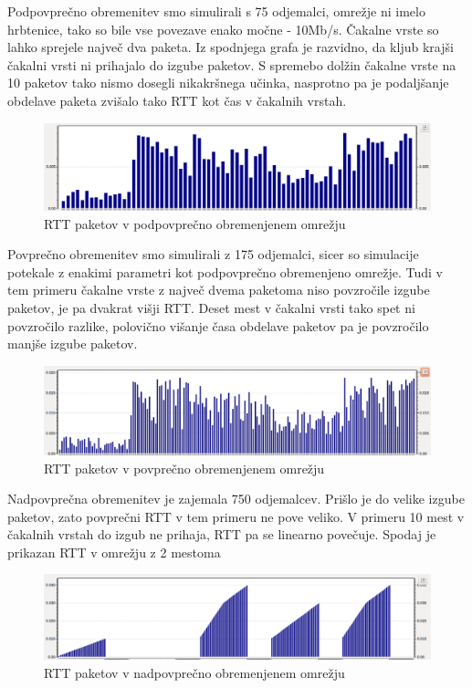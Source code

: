\documentclass[11pt, a4paper, slovene]{book}
\begin{document}
Podpovprečno obremenitev smo simulirali s 75 odjemalci, omrežje ni imelo hrbtenice, tako so bile vse povezave enako močne - 10Mb/s. Čakalne vrste so lahko sprejele največ dva paketa. Iz spodnjega grafa je razvidno, da kljub krajši čakalni vrsti ni prihajalo do izgube paketov. S spremebo dolžin čakalne vrste na 10 paketov tako nismo dosegli nikakršnega učinka, nasprotno pa je podaljšanje obdelave paketa zvišalo tako RTT kot čas v čakalnih vrstah. 

\begin{figure}[h]
	\centering
	\includegraphics[width=\textwidth]{lRtt1.png}
	\caption{RTT paketov v podpovprečno obremenjenem omrežju}
	\label{RTT1}	
\end{figure}
\pagebreak
Povprečno obremenitev smo simulirali z 175 odjemalci, sicer so simulacije potekale z enakimi parametri kot podpovprečno obremenjeno omrežje. Tudi v tem primeru čakalne vrste z največ dvema paketoma niso povzročile izgube paketov, je pa dvakrat višji RTT. Deset mest v čakalni vrsti tako spet ni povzročilo razlike, polovično višanje časa obdelave paketov pa je povzročilo manjše izgube paketov.

\begin{figure}[h]
	\centering
	\includegraphics[width=\textwidth]{aRtt1.png}
	\caption{RTT paketov v povprečno obremenjenem omrežju}
	\label{RTT2}	
\end{figure}

Nadpovprečna obremenitev je zajemala 750 odjemalcev. Prišlo je do velike izgube paketov, zato povprečni RTT v tem primeru ne pove veliko.  V primeru 10 mest v čakalnih vrstah do izgub ne prihaja, RTT pa se linearno povečuje. Spodaj je prikazan RTT v omrežju z 2 mestoma 

\begin{figure}[h]
	\centering
	\includegraphics[width=\textwidth]{hRtt1.png}
	\caption{RTT paketov v nadpovprečno obremenjenem omrežju}
	\label{RTT3}	
\end{figure}
\end{document}
